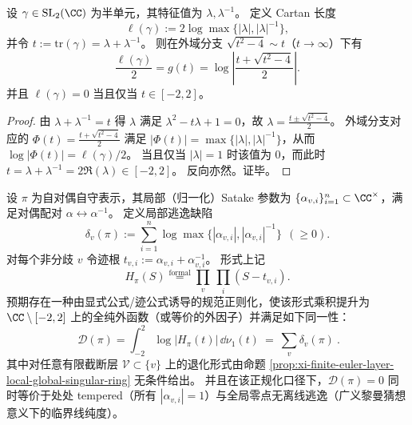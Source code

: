 

\begin{proposition}\label{prop:xi-rankone-satake-cartan-green-trace}
设 \(\gamma\in\mathrm{SL}_2(\CC)\) 为半单元，其特征值为 \(\lambda,\lambda^{-1}\)。
定义 Cartan 长度
\[
\ell(\gamma):=2\log\max\{|\lambda|,|\lambda|^{-1}\},
\]
并令 \(t:=\mathrm{tr}(\gamma)=\lambda+\lambda^{-1}\)。
则在外域分支 \(\sqrt{t^2-4}\sim t\)（\(t\to\infty\)）下有
\[
\frac{\ell(\gamma)}{2}=g(t)=\log\left|\frac{t+\sqrt{t^2-4}}{2}\right|.
\]
并且 \(\ell(\gamma)=0\) 当且仅当 \(t\in[-2,2]\)。
\end{proposition}
\begin{proof}
由 \(\lambda+\lambda^{-1}=t\) 得 \(\lambda\) 满足 \(\lambda^2-t\lambda+1=0\)，故
\(
\lambda=\frac{t\pm\sqrt{t^2-4}}{2}
\)。
外域分支对应的 \(\Phi(t)=\frac{t+\sqrt{t^2-4}}{2}\) 满足 \(|\Phi(t)|=\max\{|\lambda|,|\lambda|^{-1}\}\)，从而
\(
\log|\Phi(t)|=\ell(\gamma)/2
\)。
当且仅当 \(|\lambda|=1\) 时该值为 \(0\)，而此时 \(t=\lambda+\lambda^{-1}=2\Re(\lambda)\in[-2,2]\)。
反向亦然。证毕。
\end{proof}

\begin{conjecture}\label{conj:xi-singular-ring-langlands-rh-defect-identity}
设 \(\pi\) 为自对偶自守表示，其局部（归一化）Satake 参数为 \(\{\alpha_{v,i}\}_{i=1}^{n}\subset\CC^\times\)，满足对偶配对 \(\alpha\leftrightarrow\alpha^{-1}\)。
定义局部逃逸缺陷
\[
\delta_v(\pi):=\sum_{i=1}^{n}\log\max\{|\alpha_{v,i}|,|\alpha_{v,i}|^{-1}\}\ \ (\ge 0).
\]
对每个非分歧 \(v\) 令迹根 \(t_{v,i}:=\alpha_{v,i}+\alpha_{v,i}^{-1}\)。
形式上记
\[
H_\pi(S)\stackrel{\mathrm{formal}}{=}\prod_v\ \prod_i (S-t_{v,i}).
\]
预期存在一种由显式公式/迹公式诱导的规范正则化，使该形式乘积提升为 \(\CC\setminus[-2,2]\) 上的全纯外函数（或等价的外因子）并满足如下同一性：
\[
\boxed{\ \mathcal{D}(\pi)=\int_{-2}^{2}\log|H_\pi(t)|\,\dd\nu_1(t)\ =\ \sum_v\delta_v(\pi)\ }.
\]
其中对任意有限截断层 \(\mathcal{V}\subset\{v\}\) 上的退化形式由命题 \ref{prop:xi-finite-euler-layer-local-global-singular-ring} 无条件给出。
并且在该正规化口径下，\(\mathcal{D}(\pi)=0\) 同时等价于处处 tempered（所有 \(|\alpha_{v,i}|=1\)）与全局零点无离线逃逸（广义黎曼猜想意义下的临界线纯度）。
\end{conjecture}



